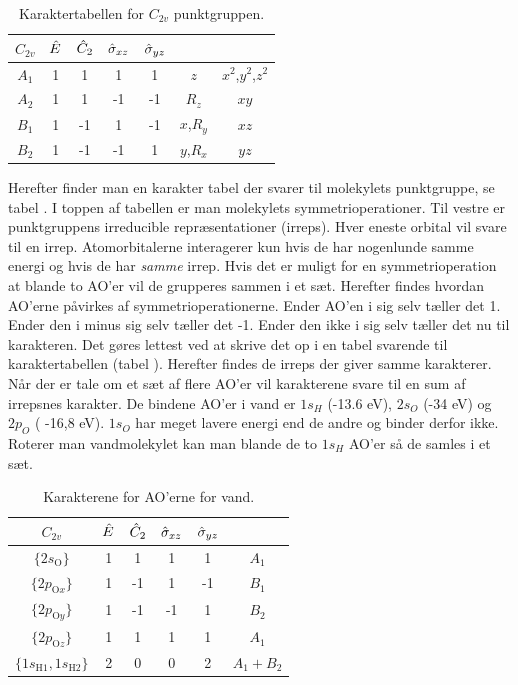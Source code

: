 \documentclass[../../Atom-ogMolekylefysik.tex]{subfiles}
\begin{document}
\begin{table}[h]
    \centering
    \begin{tabular}{c|c c c c c c}
$C_{2v}$ & $\hat E$ & $\hat C_2$ & $\hat \sigma_{xz}$ & $\hat \sigma_{yz}$\\\hline
$A_1$ & 1&1&1&1 & $z$ & $x^2$,$y^2$,$z^2$\\
$A_2$ & 1&1&-1&-1&$R_z$& $xy$\\
$B_1$ & 1 & -1&1&-1&$x$,$R_y$&$xz$\\
$B_2$ & 1&-1&-1&1&$y$,$R_x$ & $yz$
    \end{tabular}
    \caption{Karaktertabellen for $C_{2v}$ punktgruppen.}
    \label{tab:amo:C2v}
\end{table}
Herefter finder man en karakter tabel der svarer til molekylets punktgruppe, se tabel . 
I toppen af tabellen er man molekylets symmetrioperationer. Til vestre er punktgruppens irreducible repræsentationer (irreps). Hver eneste orbital vil svare til en irrep. Atomorbitalerne interagerer kun hvis de har nogenlunde samme energi og hvis de har {\em samme} irrep. Hvis det er muligt for en symmetrioperation at blande to AO'er vil de grupperes sammen i et sæt. Herefter findes hvordan AO'erne påvirkes af symmetrioperationerne. Ender AO'en i sig selv tæller det 1. Ender den i minus sig selv tæller det -1. Ender den ikke i sig selv tæller det nu til karakteren. Det gøres lettest ved at skrive det op i en tabel svarende til karaktertabellen (tabel ). Herefter findes de irreps der giver samme karakterer. Når der er tale om et sæt af flere AO'er vil karakterene svare til en sum af irrepsnes karakter. De bindene AO'er i vand er $1s_H$ (-13.6 eV), $2s_O$ (-34 eV) og $2p_O$ ( -16,8 eV). $1s_O$ har meget lavere energi end de andre og binder derfor ikke.
Roterer man vandmolekylet kan man blande de to $1s_H$ AO'er så de samles i et sæt.
\begin{table}[h]
    \centering
    \begin{tabular}{c|c c c c c}
$C_{2v}$ & $\hat E$ & $\hat C_2$ & $\hat \sigma_{xz}$ & $\hat \sigma_{yz}$\\\hline
$\{2s_\text{O}\}$ & 1 & 1 & 1 & 1 & $A_1$\\
$\{2p_{\text{O}x}\}$ & 1 & -1 & 1 & -1 & $B_1$\\
$\{2p_{\text{O}y}\}$ & 1 & -1 & -1 & 1 & $B_2$\\
$\{2p_{\text{O}z}\}$ & 1 & 1 & 1 & 1 & $A_1$\\
$\{1s_{\text{H}1},1s_{\text{H}2}\}$ & 2 & 0 & 0 & 2 & $A_1+B_2$
    \end{tabular}
    \caption{Karakterene for AO'erne for vand.}
    \label{tab:amo:MOvand}
\end{table}
\end{document}
